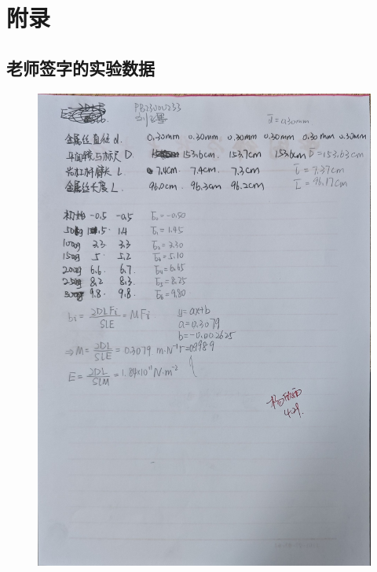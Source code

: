 \documentclass[a4paper]{extarticle}
\begin{document}
    \section*{附录}
    \subsection*{老师签字的实验数据}
    \begin{figure}[H]
        \centering
        \includegraphics[width=\linewidth]{shuju.jpg}
    \end{figure}
\end{document}
